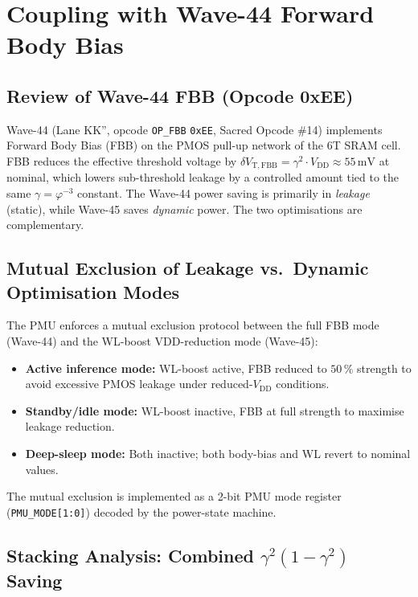 \section{Coupling with Wave-44 Forward Body Bias}
\label{sec:wlboost-wave44}

\subsection{Review of Wave-44 FBB (Opcode 0xEE)}

Wave-44 (Lane KK'', opcode \texttt{OP\_FBB} \texttt{0xEE},
Sacred Opcode \#14) implements Forward Body Bias (FBB) on the PMOS
pull-up network of the 6T SRAM cell.  FBB reduces the effective
threshold voltage by $\delta V_{\mathrm{T,FBB}} = \gamma^{2} \cdot
V_{\mathrm{DD}} \approx 55\,\text{mV}$ at nominal, which lowers
sub-threshold leakage by a controlled amount tied to the same
$\gamma = \varphi^{-3}$ constant.  The Wave-44 power saving is
primarily in \emph{leakage} (static), while Wave-45 saves
\emph{dynamic} power.  The two optimisations are complementary.

\subsection{Mutual Exclusion of Leakage vs.\ Dynamic Optimisation Modes}

The PMU enforces a mutual exclusion protocol between the full FBB mode
(Wave-44) and the WL-boost VDD-reduction mode (Wave-45):

\begin{itemize}
  \item \textbf{Active inference mode:} WL-boost active, FBB reduced
    to $50\,\%$ strength to avoid excessive PMOS leakage under
    reduced-$V_{\mathrm{DD}}$ conditions.
  \item \textbf{Standby/idle mode:} WL-boost inactive, FBB at full
    strength to maximise leakage reduction.
  \item \textbf{Deep-sleep mode:} Both inactive; both body-bias and WL
    revert to nominal values.
\end{itemize}

The mutual exclusion is implemented as a 2-bit PMU mode register
(\texttt{PMU\_MODE[1:0]}) decoded by the power-state machine.

\subsection{Stacking Analysis: Combined \texorpdfstring{$\gamma^{2}(1-\gamma^{2})$}{gamma squared times (1 minus gamma squared)} Saving}

